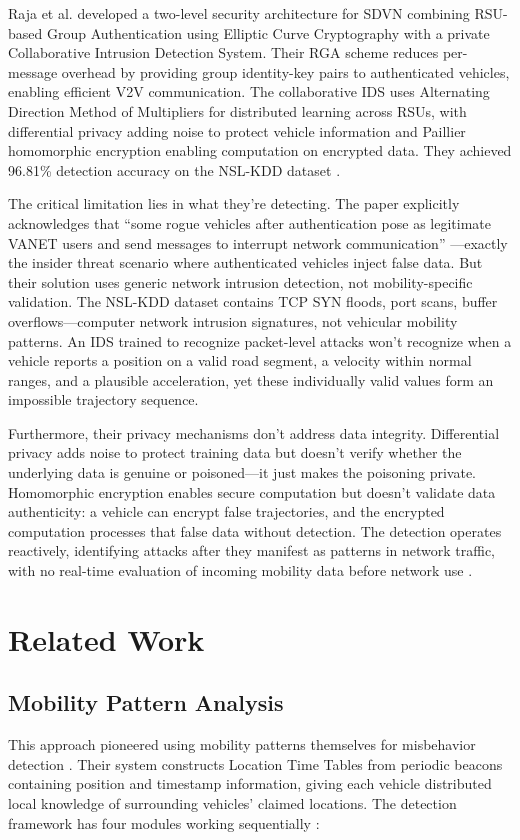 \documentclass[12pt, a4paper]{report}
\begin{document}
Raja et al.\cite{raja2021} developed a two-level security architecture for SDVN combining RSU-based Group Authentication using Elliptic Curve Cryptography with a private Collaborative Intrusion Detection System. Their RGA scheme reduces per-message overhead by providing group identity-key pairs to authenticated vehicles, enabling efficient V2V communication. The collaborative IDS uses Alternating Direction Method of Multipliers for distributed learning across RSUs, with differential privacy adding noise to protect vehicle information and Paillier homomorphic encryption enabling computation on encrypted data. They achieved 96.81\% detection accuracy on the NSL-KDD dataset \cite{raja2021}.

The critical limitation lies in what they're detecting. The paper explicitly acknowledges that ``some rogue vehicles after authentication pose as legitimate VANET users and send messages to interrupt network communication'' \cite{raja2021}---exactly the insider threat scenario where authenticated vehicles inject false data. But their solution uses generic network intrusion detection, not mobility-specific validation. The NSL-KDD dataset contains TCP SYN floods, port scans, buffer overflows---computer network intrusion signatures, not vehicular mobility patterns. An IDS trained to recognize packet-level attacks won't recognize when a vehicle reports a position on a valid road segment, a velocity within normal ranges, and a plausible acceleration, yet these individually valid values form an impossible trajectory sequence.

Furthermore, their privacy mechanisms don't address data integrity. Differential privacy adds noise to protect training data but doesn't verify whether the underlying data is genuine or poisoned---it just makes the poisoning private. Homomorphic encryption enables secure computation but doesn't validate data authenticity: a vehicle can encrypt false trajectories, and the encrypted computation processes that false data without detection. The detection operates reactively, identifying attacks after they manifest as patterns in network traffic, with no real-time evaluation of incoming mobility data before network use \cite{raja2021}.

\section{Related Work}
\label{sec:related-work}
\subsection{Mobility Pattern Analysis}
\label{subsec:mobility-pattern-analysis}
\justifying
This approach pioneered using mobility patterns themselves for misbehavior detection . Their system constructs Location Time Tables from periodic beacons containing position and timestamp information, giving each vehicle distributed local knowledge of surrounding vehicles' claimed locations. The detection framework has four modules working sequentially \cite{ghaleb2014}:
\end{document}
